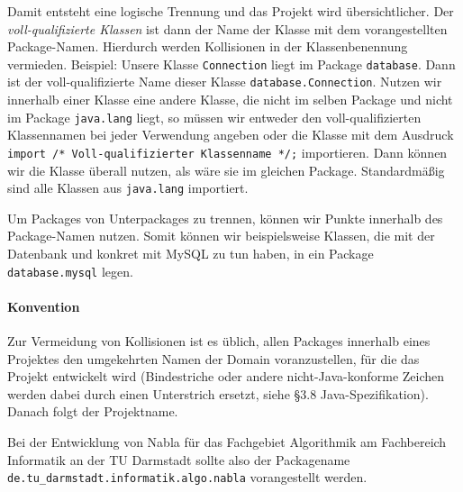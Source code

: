 		Damit entsteht eine logische Trennung und das Projekt wird übersichtlicher. Der \textit{voll-qualifizierte Klassen} ist dann der Name der Klasse mit dem vorangestellten Package-Namen. Hierdurch werden Kollisionen in der Klassenbenennung vermieden. Beispiel: Unsere Klasse \texttt{Connection} liegt im Package \texttt{database}. Dann ist der voll-qualifizierte Name dieser Klasse \texttt{database.Connection}. Nutzen wir innerhalb einer Klasse eine andere Klasse, die nicht im selben Package und nicht im Package \texttt{java.lang} liegt, so müssen wir entweder den voll-qualifizierten Klassennamen bei jeder Verwendung angeben oder die Klasse mit dem Ausdruck \lstinline|import /* Voll-qualifizierter Klassenname */;| importieren. Dann können wir die Klasse überall nutzen, als wäre sie im gleichen Package. Standardmäßig sind alle Klassen aus \lstinline{java.lang} importiert.
		
		Um Packages von Unterpackages zu trennen, können wir Punkte innerhalb des Package-Namen nutzen. Somit können wir beispielsweise Klassen, die mit der Datenbank und konkret mit MySQL zu tun haben, in ein Package \lstinline{database.mysql} legen.
		
		\paragraph{Konvention}
			Zur Vermeidung von Kollisionen ist es üblich, allen Packages innerhalb eines Projektes den umgekehrten Namen der Domain voranzustellen, für die das Projekt entwickelt wird (Bindestriche oder andere nicht-Java-konforme Zeichen werden dabei durch einen Unterstrich ersetzt, siehe §3.8 Java-Spezifikation). Danach folgt der Projektname.
			
			Bei der Entwicklung von Nabla für das Fachgebiet Algorithmik am Fachbereich Informatik an der TU Darmstadt sollte also der Packagename \lstinline|de.tu_darmstadt.informatik.algo.nabla| vorangestellt werden.
